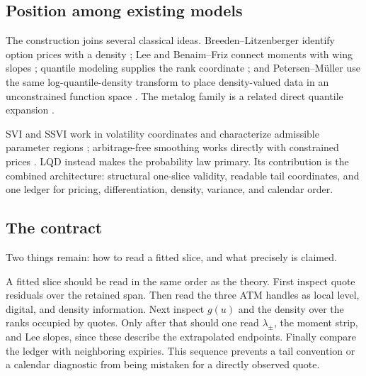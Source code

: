 \subsection{Position among existing models}

The construction joins several classical ideas.  Breeden--Litzenberger
identify option prices with a density \citep{BreedenLitzenberger1978}; Lee and
Benaim--Friz connect moments with wing slopes
\citep{Lee2004,BenaimFriz2009}; quantile modeling supplies the rank coordinate
\citep{Parzen1979,Gilchrist2000}; and Petersen--M\"uller use the same
log-quantile-density transform to place density-valued data in an
unconstrained function space \citep{PetersenMuller2016}.  The metalog family
is a related direct quantile expansion \citep{Keelin2016}.

SVI and SSVI work in volatility coordinates and characterize admissible
parameter regions \citep{Gatheral2004,GatheralJacquier2014}; arbitrage-free
smoothing works directly with constrained prices \citep{Fengler2009}.  LQD
instead makes the probability law primary.  Its contribution is the combined
architecture: structural one-slice validity, readable tail coordinates, and
one ledger for pricing, differentiation, density, variance, and calendar
order.

\subsection{The contract}
\label{sec:limits}

Two things remain: how to read a fitted slice, and what precisely is
claimed.

A fitted slice should be read in the same order as the theory.  First inspect quote residuals over the retained span.  Then read the
three ATM handles as local level, digital, and density information.  Next
inspect $g(u)$ and the density over the ranks occupied by quotes.  Only after
that should one read $\lambda_\pm$, the moment strip, and Lee slopes, since
these describe the extrapolated endpoints.  Finally compare the ledger with
neighboring expiries.  This sequence prevents a tail convention or a
calendar diagnostic from being mistaken for a directly observed quote.

